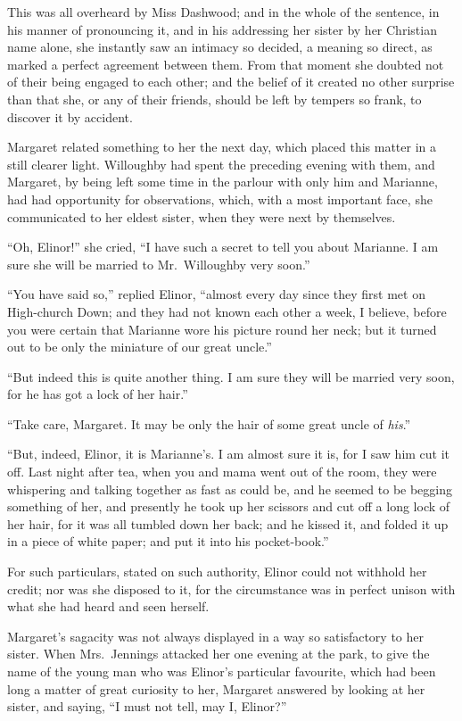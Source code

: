 This was all overheard by Miss Dashwood; and in the
whole of the sentence, in his manner of pronouncing it,
and in his addressing her sister by her Christian name alone,
she instantly saw an intimacy so decided, a meaning
so direct, as marked a perfect agreement between them.
From that moment she doubted not of their being engaged
to each other; and the belief of it created no other surprise
than that she, or any of their friends, should be left
by tempers so frank, to discover it by accident.

Margaret related something to her the next day,
which placed this matter in a still clearer light.
Willoughby had spent the preceding evening with them,
and Margaret, by being left some time in the parlour
with only him and Marianne, had had opportunity
for observations, which, with a most important face,
she communicated to her eldest sister, when they were
next by themselves.

``Oh, Elinor!'' she cried, ``I have such a secret to
tell you about Marianne.  I am sure she will be married
to Mr.\ Willoughby very soon.''

``You have said so,'' replied Elinor, ``almost every
day since they first met on High-church Down; and they
had not known each other a week, I believe, before you
were certain that Marianne wore his picture round her neck;
but it turned out to be only the miniature of our great uncle.''

``But indeed this is quite another thing.  I am sure
they will be married very soon, for he has got a lock
of her hair.''

``Take care, Margaret.  It may be only the hair
of some great uncle of \emph{his}.''

``But, indeed, Elinor, it is Marianne's. I am almost
sure it is, for I saw him cut it off.  Last night
after tea, when you and mama went out of the room,
they were whispering and talking together as fast as
could be, and he seemed to be begging something of her,
and presently he took up her scissors and cut off a long
lock of her hair, for it was all tumbled down her back;
and he kissed it, and folded it up in a piece of white paper;
and put it into his pocket-book.''

For such particulars, stated on such authority,
Elinor could not withhold her credit; nor was she disposed
to it, for the circumstance was in perfect unison with
what she had heard and seen herself.

Margaret's sagacity was not always displayed in a
way so satisfactory to her sister.  When Mrs.\ Jennings
attacked her one evening at the park, to give the name
of the young man who was Elinor's particular favourite,
which had been long a matter of great curiosity to her,
Margaret answered by looking at her sister, and saying,
``I must not tell, may I, Elinor?''

